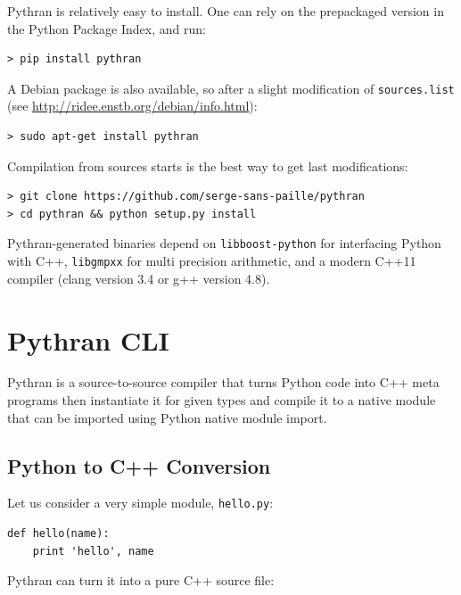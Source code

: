 \documentclass{llncs}
\begin{document}
Pythran is relatively easy to install. One can rely on the prepackaged version in the Python Package Index, and run:

\begin{lstlisting}
> pip install pythran
\end{lstlisting}

A Debian package is also available, so after a slight modification of \texttt{sources.list} (see \url{http://ridee.enstb.org/debian/info.html}):

\begin{lstlisting}
> sudo apt-get install pythran
\end{lstlisting}


Compilation from sources starts is the best way to get last modifications:

\begin{lstlisting}
> git clone https://github.com/serge-sans-paille/pythran
> cd pythran && python setup.py install
\end{lstlisting}

Pythran-generated binaries depend on \texttt{libboost-python} for interfacing
Python with C++, \texttt{libgmpxx} for multi precision arithmetic, and a modern
C++11 compiler (clang version 3.4 or g++ version 4.8).

\section{Pythran \acf{CLI}}
\label{sec:cli}

Pythran is a source-to-source compiler that turns Python code into C++ meta
programs then instantiate it for given types and compile it to a native module
that can be imported using Python native module import.

\subsection{Python to C++ Conversion}

Let us consider a very simple module, \texttt{hello.py}:

\begin{lstlisting}
def hello(name):
    print 'hello', name
\end{lstlisting}

Pythran can turn it into a pure C++ source file:
\end{document}
